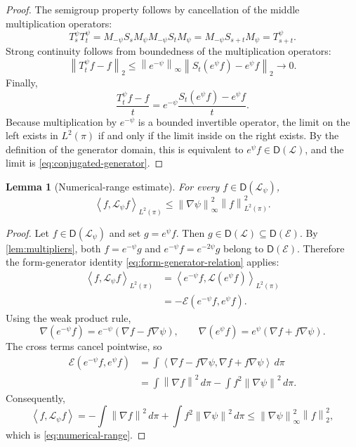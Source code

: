 \documentclass[11pt]{article}
\newtheorem{lemma}[theorem]{Lemma}
\newcommand{\cE}{\mathcal E}
\newcommand{\ip}[2]{\left\langle #1,#2\right\rangle}
\newcommand{\norm}[1]{\left\lVert #1\right\rVert}
\newcommand{\1}{\mathbf 1}
\newcommand{\D}{\mathsf D}
\begin{document}
\begin{proof}
The semigroup property follows by cancellation of the middle multiplication
operators:
\[
 T_s^\psi T_t^\psi
 =M_{-\psi}S_sM_\psi M_{-\psi}S_tM_\psi
 =M_{-\psi}S_{s+t}M_\psi
 =T_{s+t}^\psi.
\]
Strong continuity follows from boundedness of the multiplication operators:
\[
 \norm{T_t^\psi f-f}_2
 \leq
 \norm{e^{-\psi}}_\infty
 \norm{S_t(e^\psi f)-e^\psi f}_2
 \longrightarrow0.
\]
Finally,
\[
 \frac{T_t^\psi f-f}{t}
 =e^{-\psi}
 \frac{S_t(e^\psi f)-e^\psi f}{t}.
\]
Because multiplication by \(e^{-\psi}\) is a bounded invertible operator,
the limit on the left exists in \(L^2(\pi)\) if and only if the limit inside
on the right exists.  By the definition of the generator domain, this is
equivalent to \(e^\psi f\in\D(\mathcal L)\), and the limit is
\eqref{eq:conjugated-generator}.
\end{proof}

\begin{lemma}[Numerical-range estimate]\label{lem:numerical-range}
For every \(f\in\D(\mathcal L_\psi)\),
\begin{equation}\label{eq:numerical-range}
 \ip{f}{\mathcal L_\psi f}_{L^2(\pi)}
 \leq
 \norm{\nabla\psi}_\infty^2\norm f_{L^2(\pi)}^2.
\end{equation}
\end{lemma}

\begin{proof}
Let \(f\in\D(\mathcal L_\psi)\) and set \(g=e^\psi f\).  Then
\(g\in\D(\mathcal L)\subseteq\D(\cE)\).  By
\cref{lem:multipliers}, both \(f=e^{-\psi}g\) and
\(e^{-\psi}f=e^{-2\psi}g\) belong to \(\D(\cE)\).  Therefore the
form-generator identity \eqref{eq:form-generator-relation} applies:
\begin{align*}
 \ip{f}{\mathcal L_\psi f}_{L^2(\pi)}
 &=\ip{e^{-\psi}f}{\mathcal L(e^\psi f)}_{L^2(\pi)}\\
 &=-\cE(e^{-\psi}f,e^\psi f).
\end{align*}
Using the weak product rule,
\[
 \nabla(e^{-\psi}f)=e^{-\psi}(\nabla f-f\nabla\psi),
 \qquad
 \nabla(e^\psi f)=e^\psi(\nabla f+f\nabla\psi).
\]
The cross terms cancel pointwise, so
\begin{align*}
 \cE(e^{-\psi}f,e^\psi f)
 &=\int
 \ip{\nabla f-f\nabla\psi}{\nabla f+f\nabla\psi}
 \,d\pi\\
 &=\int\norm{\nabla f}^2\,d\pi
   -\int f^2\norm{\nabla\psi}^2\,d\pi.
\end{align*}
Consequently,
\[
 \ip{f}{\mathcal L_\psi f}
 =-\int\norm{\nabla f}^2\,d\pi
  +\int f^2\norm{\nabla\psi}^2\,d\pi
 \leq
 \norm{\nabla\psi}_\infty^2\norm f_2^2,
\]
which is \eqref{eq:numerical-range}.
\end{proof}
\end{document}
